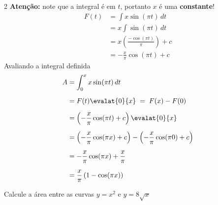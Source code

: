 \documentclass[a4paper,12pt,fleqn]{article}
\begin{document}
\begin{answer}
\begin{multicols}{2}
  \textbf{Atenção:} note que a integral é em $t$, portanto $x$ é uma \textbf{constante}!
  \begin{align*}
    F(t)
    & = \int x\sin(\pi t) \, dt \\[2mm]
    & = x \int \sin(\pi t) \, dt \\[2mm]
    & = x \left(\frac{-\cos(\pi t)}{\pi}\right) + c \\[2mm]
    & = -\frac{x}{\pi} \cos(\pi t) + c
  \end{align*}
  Avaliando a integral definida
  \begin{align*}
    A
    & = \int_0^x x\sin(\pi t) \, dt \\[2mm]
    & = F(t) \evalat{0}{x}
    \;=\; F(x) - F(0) \\[2mm]
    & = \left(-\frac{x}{\pi} \cos(\pi t) + c\right) \evalat{0}{x}  \\[2mm]
    & = \left(-\frac{x}{\pi} \cos(\pi x) + c\right)
      - \left(-\frac{x}{\pi} \cos(\pi 0) + c\right)   \\[2mm]
    & = -\frac{x}{\pi} \cos(\pi x)
      +  \frac{x}{\pi}  \\[2mm]
    & = \frac{x}{\pi} \left(1 - \cos(\pi x)\right)
  \end{align*}
\end{multicols}
\end{answer}

Calcule a área entre as curvas
\(
  y = x^2
\)
e
\(
  y = 8\sqrt{x}
\)

\clearpagequestiononly
\end{document}
